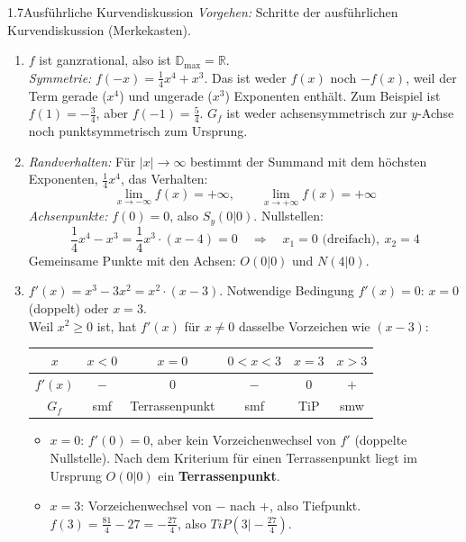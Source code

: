 \begin{loesung}{1.7}{Ausführliche Kurvendiskussion}
\textit{Vorgehen:} Schritte der ausführlichen Kurvendiskussion (Merkekasten).
\begin{enumerate}[label=\alph*)]
  \item $f$ ist ganzrational, also ist $\mathds{D}_{\text{max}} = \mathds{R}$.\\
  \textit{Symmetrie:} $f(-x) = \frac{1}{4}x^4+x^3$. Das ist weder $f(x)$ noch $-f(x)$, weil der Term gerade ($x^4$) und ungerade ($x^3$) Exponenten enthält. Zum Beispiel ist $f(1)=-\frac{3}{4}$, aber $f(-1)=\frac{5}{4}$. $G_f$ ist weder achsensymmetrisch zur $y$-Achse noch punktsymmetrisch zum Ursprung.
  \item \textit{Randverhalten:} Für $|x|\longrightarrow\infty$ bestimmt der Summand mit dem höchsten Exponenten, $\frac{1}{4}x^4$, das Verhalten:
  \[\lim\limits_{x\longrightarrow -\infty} f(x) = +\infty,\qquad \lim\limits_{x\longrightarrow +\infty} f(x) = +\infty\]
  \textit{Achsenpunkte:} $f(0) = 0$, also $S_y(0|0)$. Nullstellen:
  \[\dfrac{1}{4}x^4-x^3 = \dfrac{1}{4}x^3\cdot(x-4) = 0 \quad\Longrightarrow\quad x_1 = 0 \text{ (dreifach)},\ x_2 = 4\]
  Gemeinsame Punkte mit den Achsen: $O(0|0)$ und $N(4|0)$.
  \item $f'(x) = x^3-3x^2 = x^2\cdot(x-3)$. Notwendige Bedingung $f'(x)=0$: $x=0$ (doppelt) oder $x=3$.\\
  Weil $x^2\geq 0$ ist, hat $f'(x)$ für $x\neq 0$ dasselbe Vorzeichen wie $(x-3)$:
  \begin{center}\begin{tabular}{||c|c|c|c|c|c||}
    \hline
    $x$ & $x<0$ & $x=0$ & $0<x<3$ & $x=3$ & $x>3$\\
    \hline\hline
    $f'(x)$ & $-$ & $0$ & $-$ & $0$ & $+$\\
    \hline
    $G_f$ & smf & Terrassenpunkt & smf & TiP & smw\\
    \hline
  \end{tabular}\end{center}
  \begin{itemize}
    \item $x=0$: $f'(0)=0$, aber kein Vorzeichenwechsel von $f'$ (doppelte Nullstelle). Nach dem Kriterium für einen Terrassenpunkt liegt im Ursprung $O(0|0)$ ein \textbf{Terrassenpunkt}.
    \item $x=3$: Vorzeichenwechsel von $-$ nach $+$, also Tiefpunkt. $f(3) = \frac{81}{4}-27 = -\frac{27}{4}$, also $TiP\left(3\big|-\frac{27}{4}\right)$.
  \end{itemize}

\end{enumerate}
\end{loesung}
